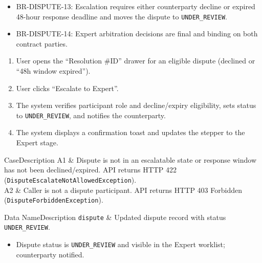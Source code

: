 \begin{itemize}[leftmargin=1.6em,topsep=3pt,itemsep=2pt,parsep=0pt,label=$\bullet$]\brrulelist
      \item BR-DISPUTE-13: Escalation requires either counterparty decline or expired 48-hour response deadline and moves the dispute to \texttt{UNDER\_REVIEW}.
      \item BR-DISPUTE-14: Expert arbitration decisions are final and binding on both contract parties.
\end{itemize}

\begin{enumerate}[leftmargin=1.8em,topsep=3pt,itemsep=2pt,parsep=0pt]
      \item User opens the ``Resolution \#ID'' drawer for an eligible dispute (declined or ``48h window expired'').
      \item User clicks ``Escalate to Expert''.
      \item The system verifies participant role and decline/expiry eligibility, sets status to \texttt{UNDER\_REVIEW}, and notifies the counterparty.
      \item The system displays a confirmation toast and updates the stepper to the Expert stage.
\end{enumerate}

\begin{flowtable}{Case}{Description}
      A1 & Dispute is not in an escalatable state or response window has not been declined/expired. API returns HTTP 422 (\texttt{DisputeEscalateNotAllowedException}).\\ \hline
      A2 & Caller is not a dispute participant. API returns HTTP 403 Forbidden (\texttt{DisputeForbiddenException}).\\ \hline
\end{flowtable}

\begin{specdatatable}{Data Name}{Description}
      \texttt{dispute} & Updated dispute record with status \texttt{UNDER\_REVIEW}.\\ \hline
\end{specdatatable}

\begin{itemize}[leftmargin=1.6em,topsep=3pt,itemsep=2pt,parsep=0pt,label=$\bullet$]
      \item Dispute status is \texttt{UNDER\_REVIEW} and visible in the Expert worklist; counterparty notified.
\end{itemize}

